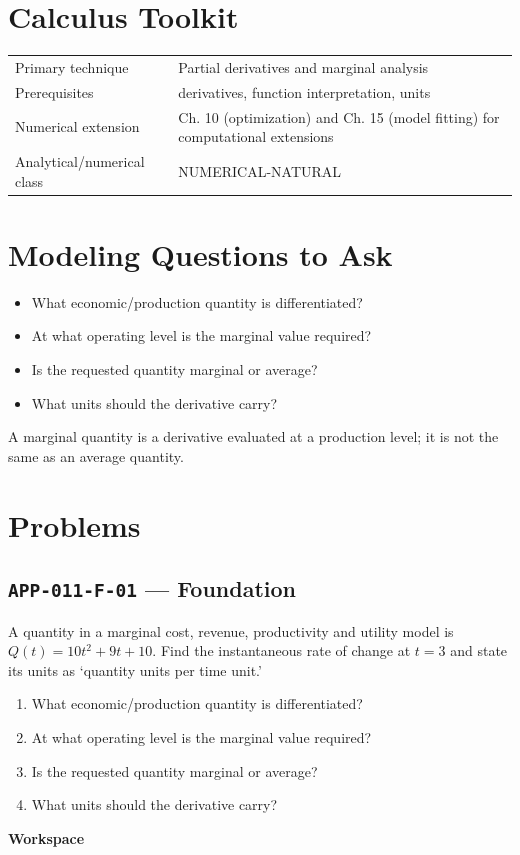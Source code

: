 \documentclass[11pt]{book}
\newcommand{\pid}[1]{\texttt{#1}}
\newcommand{\workspace}{\par\vspace{0.7in}\hrulefill\par\vspace{0.55in}\hrulefill\par}
\begin{document}
\section*{Calculus Toolkit}
\begin{tabularx}{\textwidth}{@{}lX@{}}\toprule
Primary technique & Partial derivatives and marginal analysis \\
Prerequisites & derivatives, function interpretation, units \\
Numerical extension & Ch. 10 (optimization) and Ch. 15 (model fitting) for computational extensions \\
Analytical/numerical class & NUMERICAL-NATURAL \\
\bottomrule\end{tabularx}
\section*{Modeling Questions to Ask}\begin{itemize}
\item What economic/production quantity is differentiated?
\item At what operating level is the marginal value required?
\item Is the requested quantity marginal or average?
\item What units should the derivative carry?
\end{itemize}
\begin{errorbox}A marginal quantity is a derivative evaluated at a production level; it is not the same as an average quantity.\end{errorbox}
\section*{Problems}
\subsection*{\pid{APP-011-F-01} — Foundation}
\begin{problembox}
A quantity in a marginal cost, revenue, productivity and utility model is $Q(t)=10t^2+9t+10$. Find the instantaneous rate of change at $t=3$ and state its units as ‘quantity units per time unit.’
\end{problembox}
\begin{promptbox}\begin{enumerate}
\item What economic/production quantity is differentiated?
\item At what operating level is the marginal value required?
\item Is the requested quantity marginal or average?
\item What units should the derivative carry?
\end{enumerate}\end{promptbox}
\textbf{Workspace}\workspace
{}
\end{document}
